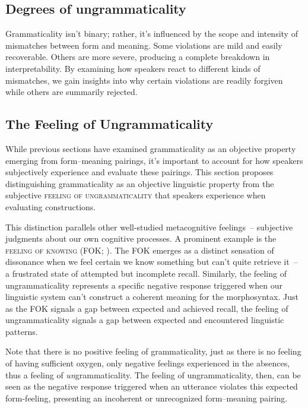 \documentclass[12pt,letterpaper]{article}
\begin{document}
\subsection{Degrees of ungrammaticality}\label{sec:degrees}

Grammaticality isn't binary; rather, it's influenced by the scope and intensity of mismatches between form and meaning. Some violations are mild and easily recoverable. Others are more severe, producing a complete breakdown in interpretability. By examining how speakers react to different kinds of mismatches, we gain insights into why certain violations are readily forgiven while others are summarily rejected.

\subsection{The Feeling of Ungrammaticality}\label{sec:feeling}

While previous sections have examined grammaticality as an objective property emerging from form--meaning pairings, it's important to account for how speakers subjectively experience and evaluate these pairings. This section proposes distinguishing grammaticality as an objective linguistic property from the subjective \textsc{feeling of ungrammaticality} that speakers experience when evaluating constructions.

This distinction parallels other well-studied metacognitive feelings~-- subjective judgments about our own cognitive processes. A prominent example is the \textsc{feeling of knowing} (FOK; \cite{hart1965}). The FOK emerges as a distinct sensation of dissonance when we feel certain we know something but can't quite retrieve it~-- a frustrated state of attempted but incomplete recall. Similarly, the feeling of ungrammaticality represents a specific negative response triggered when our linguistic system can't construct a coherent meaning for the morphosyntax. Just as the FOK signals a gap between expected and achieved recall, the feeling of ungrammaticality signals a gap between expected and encountered linguistic patterns.

Note that there is no positive feeling of grammaticality, just as there is no feeling of having sufficient oxygen, only negative feelings experienced in the absences, thus a feeling of \emph{un}grammaticality. The feeling of ungrammaticality, then, can be seen as the negative response triggered when an utterance violates this expected form-feeling, presenting an incoherent or unrecognized form--meaning pairing.
\end{document}
